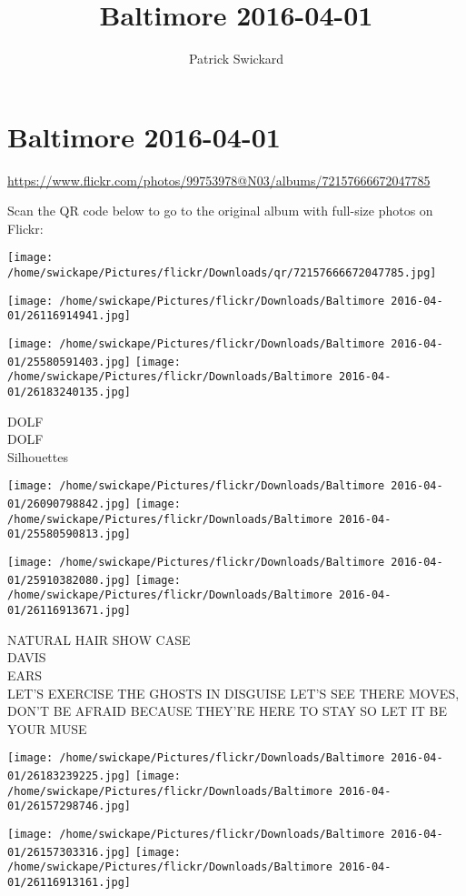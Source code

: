\documentclass[10pt,letterpaper]{article}
\title{Baltimore 2016-04-01}
\author{Patrick Swickard}
\date{}
\begin{document}
\section*{Baltimore 2016-04-01}

\url{https://www.flickr.com/photos/99753978@N03/albums/72157666672047785}

Scan the QR code below to go to the original album with full-size photos on Flickr:

\texttt{[image: /home/swickape/Pictures/flickr/Downloads/qr/72157666672047785.jpg]}
\pagebreak

\texttt{[image: /home/swickape/Pictures/flickr/Downloads/Baltimore 2016-04-01/26116914941.jpg]}

\vspace{0.25in}
\texttt{[image: /home/swickape/Pictures/flickr/Downloads/Baltimore 2016-04-01/25580591403.jpg]}
\texttt{[image: /home/swickape/Pictures/flickr/Downloads/Baltimore 2016-04-01/26183240135.jpg]}

DOLF\\
DOLF\\
Silhouettes
\pagebreak

\texttt{[image: /home/swickape/Pictures/flickr/Downloads/Baltimore 2016-04-01/26090798842.jpg]}
\texttt{[image: /home/swickape/Pictures/flickr/Downloads/Baltimore 2016-04-01/25580590813.jpg]}

\texttt{[image: /home/swickape/Pictures/flickr/Downloads/Baltimore 2016-04-01/25910382080.jpg]}
\texttt{[image: /home/swickape/Pictures/flickr/Downloads/Baltimore 2016-04-01/26116913671.jpg]}

NATURAL HAIR SHOW CASE\\
DAVIS\\
EARS\\
LET'S EXERCISE THE GHOSTS IN DISGUISE LET'S SEE THERE MOVES, DON'T BE AFRAID BECAUSE THEY'RE HERE TO STAY SO LET IT BE YOUR MUSE
\pagebreak

\texttt{[image: /home/swickape/Pictures/flickr/Downloads/Baltimore 2016-04-01/26183239225.jpg]}
\texttt{[image: /home/swickape/Pictures/flickr/Downloads/Baltimore 2016-04-01/26157298746.jpg]}

\texttt{[image: /home/swickape/Pictures/flickr/Downloads/Baltimore 2016-04-01/26157303316.jpg]}
\texttt{[image: /home/swickape/Pictures/flickr/Downloads/Baltimore 2016-04-01/26116913161.jpg]}
\end{document}
